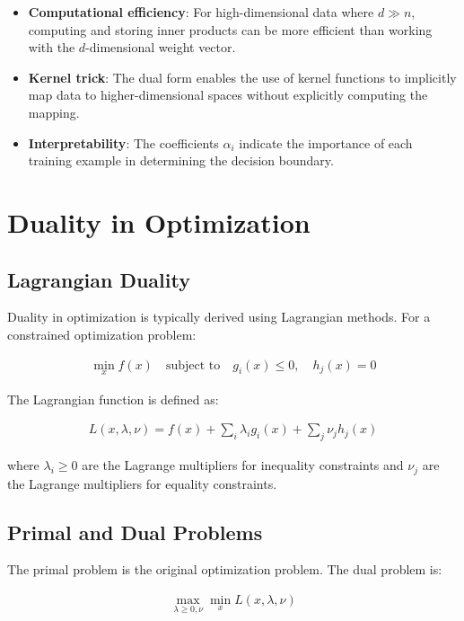 \documentclass{article}
\begin{document}
\begin{itemize}
    \item \textbf{Computational efficiency}: For high-dimensional data where $d \gg n$, computing and storing inner products can be more efficient than working with the $d$-dimensional weight vector.
    
    \item \textbf{Kernel trick}: The dual form enables the use of kernel functions to implicitly map data to higher-dimensional spaces without explicitly computing the mapping.
    
    \item \textbf{Interpretability}: The coefficients $\alpha_i$ indicate the importance of each training example in determining the decision boundary.
\end{itemize}

\section{Duality in Optimization}

\subsection{Lagrangian Duality}
Duality in optimization is typically derived using Lagrangian methods. For a constrained optimization problem:

\begin{align}
\min_{x} f(x) \quad \text{subject to} \quad g_i(x) \leq 0, \quad h_j(x) = 0
\end{align}

The Lagrangian function is defined as:

\begin{align}
L(x, \lambda, \nu) = f(x) + \sum_i \lambda_i g_i(x) + \sum_j \nu_j h_j(x)
\end{align}

where $\lambda_i \geq 0$ are the Lagrange multipliers for inequality constraints and $\nu_j$ are the Lagrange multipliers for equality constraints.

\subsection{Primal and Dual Problems}
The primal problem is the original optimization problem. The dual problem is:

\begin{align}
\max_{\lambda \geq 0, \nu} \min_{x} L(x, \lambda, \nu)
\end{align}
\end{document}
